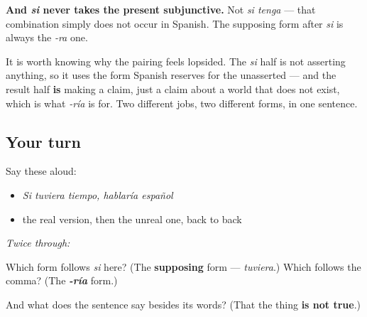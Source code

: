 \begin{culture}
\textbf{And \emph{si} never takes the present subjunctive.} Not \emph{si tenga} — that combination simply does not occur in Spanish. The supposing form after \emph{si} is always the \emph{-ra} one.

It is worth knowing why the pairing feels lopsided. The \emph{si} half is not asserting anything, so it uses the form Spanish reserves for the unasserted — and the result half \textbf{is} making a claim, just a claim about a world that does not exist, which is what \emph{-ría} is for. Two different jobs, two different forms, in one sentence.
\end{culture}

\subsection*{Your turn}
Say these aloud:

\begin{itemize}
\raggedright
  \item \emph{Si tuviera tiempo, hablaría español}
  \item the real version, then the unreal one, back to back
\end{itemize}

\emph{Twice through:}

\begin{tcolorbox}[breakable,colback=teal!4,colframe=teal!35!black,title={Before you move on}]
Which form follows \emph{si} here? (The \textbf{supposing} form — \emph{tuviera}.) Which follows the comma? (The \emph{\textbf{-ría}} form.)

And what does the sentence say besides its words? (That the thing \textbf{is not true}.)
\end{tcolorbox}
